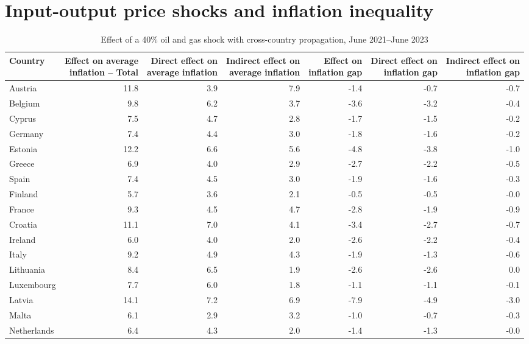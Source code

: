 \documentclass[11pt]{article}
\begin{document}
\section*{Input-output price shocks and inflation inequality}
\begin{table}[H]
\centering
\caption{Effect of a 40\% oil and gas shock with cross-country propagation, June 2021--June 2023}
\label{tab:shock-oil-gas-chain-ea20}
\scriptsize
\setlength{\tabcolsep}{1.2pt}
\begin{tabular}{lrrrrrr}
\toprule
Country & \shortstack{Effect on average\\inflation -- Total} & \shortstack{Direct effect on\\average inflation} & \shortstack{Indirect effect on\\average inflation} & \shortstack{Effect on\\inflation gap} & \shortstack{Direct effect on\\inflation gap} & \shortstack{Indirect effect on\\inflation gap}
 \\
\midrule
Austria & 11.8 & 3.9 & 7.9 & -1.4 & -0.7 & -0.7
 \\
Belgium & 9.8 & 6.2 & 3.7 & -3.6 & -3.2 & -0.4
 \\
Cyprus & 7.5 & 4.7 & 2.8 & -1.7 & -1.5 & -0.2
 \\
Germany & 7.4 & 4.4 & 3.0 & -1.8 & -1.6 & -0.2
 \\
Estonia & 12.2 & 6.6 & 5.6 & -4.8 & -3.8 & -1.0
 \\
Greece & 6.9 & 4.0 & 2.9 & -2.7 & -2.2 & -0.5
 \\
Spain & 7.4 & 4.5 & 3.0 & -1.9 & -1.6 & -0.3
 \\
Finland & 5.7 & 3.6 & 2.1 & -0.5 & -0.5 & -0.0
 \\
France & 9.3 & 4.5 & 4.7 & -2.8 & -1.9 & -0.9
 \\
Croatia & 11.1 & 7.0 & 4.1 & -3.4 & -2.7 & -0.7
 \\
Ireland & 6.0 & 4.0 & 2.0 & -2.6 & -2.2 & -0.4
 \\
Italy & 9.2 & 4.9 & 4.3 & -1.9 & -1.3 & -0.6
 \\
Lithuania & 8.4 & 6.5 & 1.9 & -2.6 & -2.6 & 0.0
 \\
Luxembourg & 7.7 & 6.0 & 1.8 & -1.1 & -1.1 & -0.1
 \\
Latvia & 14.1 & 7.2 & 6.9 & -7.9 & -4.9 & -3.0
 \\
Malta & 6.1 & 2.9 & 3.2 & -1.0 & -0.7 & -0.3
 \\
Netherlands & 6.4 & 4.3 & 2.0 & -1.4 & -1.3 & -0.0

\end{tabular}
\end{table}
\end{document}
